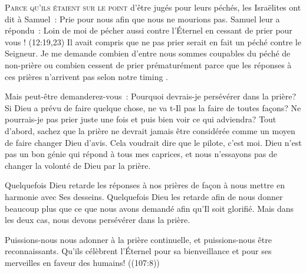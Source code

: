 




\lettrine{P}{arce qu'ils étaient sur le point} d'être jugés pour leurs péchés,
 les Israëlites ont dit à Samuel~: 
 \og Prie pour nous afin que nous ne mourions pas. \fg{} 
 Samuel leur a répondu~: 
 \og Loin de moi de pécher aussi contre l'Éternel en cessant de prier
 pour vous ! \fg{}
 (12:19,23)
 Il avait compris que ne pas prier serait en fait un péché contre le Seigneur.
 Je me demande combien d'entre nous sommes coupables du péché de
 \og non-prière \fg{} ou combien cessent de prier prématurément
 parce que les réponses à ces prières n'arrivent pas
 selon notre \og timing \fg{}.


Mais peut-être demanderez-vous~: 
 \og Pourquoi devrais-je persévérer dans la prière?
 Si Dieu a prévu de faire quelque chose, ne va t-Il pas la faire
 de toutes façons? Ne pourrais-je pas prier juste une fois et puis bien voir
 ce qui adviendra? \fg{}
 Tout d'abord, sachez que la prière ne devrait jamais être considérée
 comme un moyen de faire changer Dieu d'avis.
 Cela voudrait dire que le pilote, c'est moi.
 Dieu n'est pas un bon génie qui répond à tous mes caprices,
 et nous n'essayons pas de changer la volonté de Dieu par la prière.

Quelquefois Dieu retarde les réponses à nos prières de façon à nous mettre
 en harmonie avec Ses desseins. Quelquefois Dieu les retarde afin de nous
 donner beaucoup plus que ce que nous avons demandé afin qu'Il soit glorifié.
 Mais dans les deux cas, nous devons persévérer dans la prière.

Puissions-nous nous adonner à la prière continuelle, et puissions-nous
 être reconnaissants.
 \og Qu'ils célèbrent l'Éternel pour sa bienveillance et pour ses merveilles
 en faveur des humains! \fg{} ((107:8))

\dvrule




